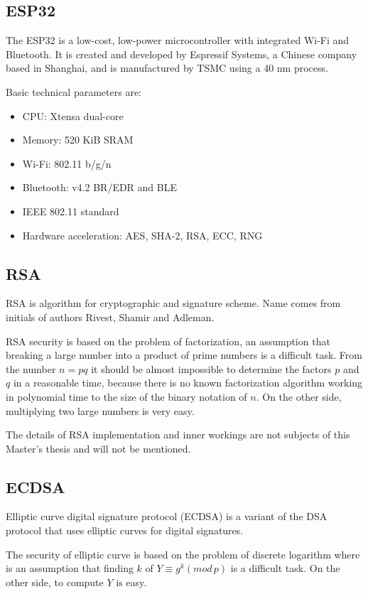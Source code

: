 \documentclass[thesis=M,english]{FITthesis}[2019/12/23]
\begin{document}
\subsection{ESP32}
The ESP32 is a low-cost, low-power microcontroller with integrated Wi-Fi and Bluetooth. It is created and developed by Espressif Systems, a Chinese company based in Shanghai, and is manufactured by TSMC using a 40 nm process.

\bigskip
\noindent
Basic technical parameters are:
\begin{itemize}
\item	CPU: Xtensa dual-core
\item	Memory: 520 KiB SRAM
\item	Wi-Fi: 802.11 b/g/n
\item	Bluetooth: v4.2 BR/EDR and BLE
\item	IEEE 802.11 standard
\item	Hardware acceleration: AES, SHA-2, RSA, ECC, RNG
\end{itemize}

\subsection{RSA}
RSA is algorithm for cryptographic and signature scheme. Name comes from initials of authors Rivest, Shamir and Adleman.

\bigskip
\noindent
RSA security is based on the problem of factorization, an assumption that breaking a large number into a product of prime numbers is a difficult task. From the number $n = pq$ it should be almost impossible to determine the factors $p$ and $q$ in a reasonable time, because there is no known factorization algorithm working in polynomial time to the size of the binary notation of $n$. On the other side, multiplying two large numbers is very easy.

\bigskip
\noindent
The details of RSA implementation and inner workings are not subjects of this Master's thesis and will not be mentioned.

\subsection{ECDSA}
Elliptic curve digital signature protocol (ECDSA) is a variant of the DSA protocol that uses elliptic curves for digital signatures.

\bigskip
\noindent
The security of elliptic curve is based on the problem of discrete logarithm where is an assumption that finding $k$ of $Y \equiv g^k (mod \, p)$ is a difficult task. On the other side, to compute $Y$ is easy.
\end{document}
